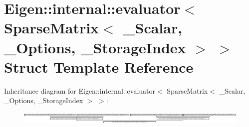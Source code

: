 \hypertarget{struct_eigen_1_1internal_1_1evaluator_3_01_sparse_matrix_3_01___scalar_00_01___options_00_01___storage_index_01_4_01_4}{}\section{Eigen\+:\+:internal\+:\+:evaluator$<$ Sparse\+Matrix$<$ \+\_\+\+Scalar, \+\_\+\+Options, \+\_\+\+Storage\+Index $>$ $>$ Struct Template Reference}
\label{struct_eigen_1_1internal_1_1evaluator_3_01_sparse_matrix_3_01___scalar_00_01___options_00_01___storage_index_01_4_01_4}
Inheritance diagram for Eigen\+:\+:internal\+:\+:evaluator$<$ Sparse\+Matrix$<$ \+\_\+\+Scalar, \+\_\+\+Options, \+\_\+\+Storage\+Index $>$ $>$\+:\begin{figure}[H]
\begin{center}
\leavevmode
\includegraphics[height=0.620384cm]{struct_eigen_1_1internal_1_1evaluator_3_01_sparse_matrix_3_01___scalar_00_01___options_00_01___storage_index_01_4_01_4}
\end{center}
\end{figure}
